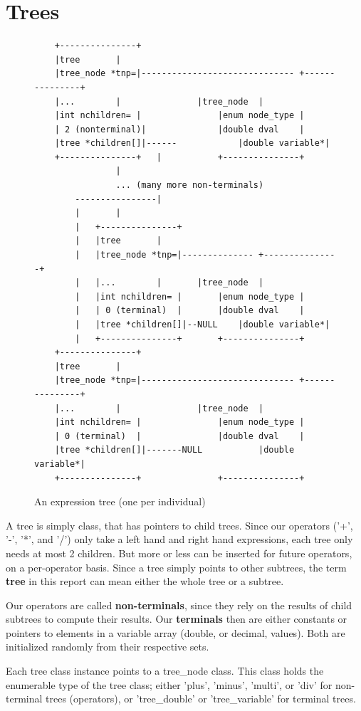 \documentclass[12pt]{article}
\begin{document}
\section{Trees}
\label{sec:trees}
\begin{figure}[!h]
        \begin{center}
		\scriptsize
		\begin{lstlisting}
	+---------------+
	|tree		|
	|tree_node *tnp=|------------------------------ +---------------+
	|...		|				|tree_node	|
	|int nchildren= |				|enum node_type	|
	| 2 (nonterminal)|				|double dval	|
	|tree *children[]|------			|double variable*|
	+---------------+	|			+---------------+
				|
				... (many more non-terminals)
		----------------|
		|		|
		|	+---------------+
		|	|tree		|
		|	|tree_node *tnp=|-------------- +---------------+
		|	|...		|		|tree_node	|
		|	|int nchildren= |		|enum node_type	|
		|	| 0 (terminal)	|		|double dval	|
		|	|tree *children[]|--NULL	|double variable*|
		|	+---------------+		+---------------+
	+---------------+
	|tree		|
	|tree_node *tnp=|------------------------------ +---------------+
	|...		|				|tree_node	|
	|int nchildren= |				|enum node_type	|
	| 0 (terminal)	|				|double dval	|
	|tree *children[]|-------NULL			|double variable*|
	+---------------+				+---------------+
		\end{lstlisting}
		\normalsize
               \caption{An expression tree (one per individual)}
                \label{tree_rep}
        \end{center}
\end{figure}

A tree is simply class, that has pointers to child trees. Since our operators ('+', '-', '*', and '/') only take a left hand and right hand expressions, each tree only needs at most 2 children. But more or less can be inserted for future operators, on a per-operator basis. Since a tree simply points to other subtrees, the term \textbf{tree} in this report can mean either the whole tree or a subtree.

Our operators are called \textbf{non-terminals}, since they rely on the results of child subtrees to compute their results. Our \textbf{terminals} then are either constants or pointers to elements in a variable array (double, or decimal, values). Both are initialized randomly from their respective sets.

Each tree class instance points to a tree\_node class. This class holds the enumerable type of the tree class; either 'plus', 'minus', 'multi', or 'div' for non-terminal trees (operators), or 'tree\_double' or 'tree\_variable' for terminal trees.
\end{document}
